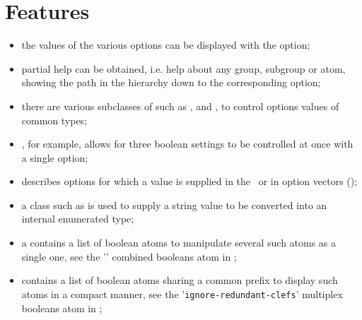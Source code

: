 %


\section{Features}

\begin{itemize}
\item the values of the various options can be displayed with the  option;

\item partial help can be obtained, i.e. help about any group, subgroup or atom,
    showing the path in the hierarchy down to the corresponding option;

\item there are various subclasses of  such as , 
    and , to control options values of common types;

\item {}, for example, allows for three boolean settings
    to be controlled at once with a single option;

\item {} describes options for which a value is supplied
    in the \CLI\ or in option vectors (\API);

\item a class such as  is used
    to supply a string value to be converted into an internal enumerated type;

\item a  contains a list of boolean atoms
    to manipulate several such atoms as a single one,
    see the '' combined booleans atom in ;

\item {} contains a list of boolean atoms
    sharing a common prefix to display such atoms in a compact manner,
    see the '{\tt ignore-redundant-clefs}' multiplex booleans atom in ;


\end{itemize}

